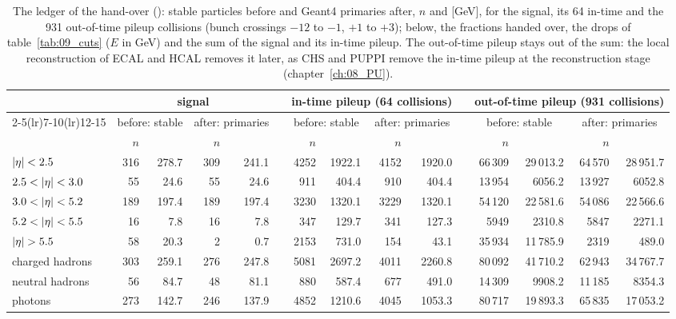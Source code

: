 \begin{table}[htbp]
\centering\scriptsize\setlength{\tabcolsep}{2.5pt}
\caption{The ledger of the hand-over (): stable particles before and Geant4 primaries
after, $n$ and \pt{} [GeV], for the signal, its 64 in-time and the 931 out-of-time pileup collisions (bunch crossings
$-12$ to $-1$, $+1$ to $+3$); below, the fractions handed over, the drops of table~\ref{tab:09_cuts} ($E$ in GeV) and
the sum of the signal and its in-time pileup. The out-of-time pileup stays out of the sum: the local reconstruction of
ECAL and HCAL removes it later, as CHS and PUPPI remove the in-time pileup at the reconstruction stage
(chapter~\ref{ch:08_PU}).}
\label{tab:09_ledger}
\begin{tabular}{lrrrrcrrrrcrrrr}
\toprule
 & \multicolumn{4}{c}{signal} & & \multicolumn{4}{c}{in-time pileup (64 collisions)} & & \multicolumn{4}{c}{out-of-time pileup (931 collisions)} \\
\cmidrule(lr){2-5}\cmidrule(lr){7-10}\cmidrule(lr){12-15}
 & \multicolumn{2}{c}{before: stable} & \multicolumn{2}{c}{after: primaries} & & \multicolumn{2}{c}{before: stable} & \multicolumn{2}{c}{after: primaries} & & \multicolumn{2}{c}{before: stable} & \multicolumn{2}{c}{after: primaries} \\
 & $n$ & \pt{} & $n$ & \pt{} & & $n$ & \pt{} & $n$ & \pt{} & & $n$ & \pt{} & $n$ & \pt{} \\
\midrule
$|\eta|<2.5$     & 316 & 278.7 & 309 & 241.1 & & 4252 & 1922.1 & 4152 & 1920.0 & & 66\,309 & 29\,013.2 & 64\,570 & 28\,951.7 \\
$2.5<\abseta<3.0$ & 55 & 24.6 & 55 & 24.6 & & 911 & 404.4 & 910 & 404.4 & & 13\,954 & 6056.2 & 13\,927 & 6052.8 \\
$3.0<\abseta<5.2$ & 189 & 197.4 & 189 & 197.4 & & 3230 & 1320.1 & 3229 & 1320.1 & & 54\,120 & 22\,581.6 & 54\,086 & 22\,566.6 \\
$5.2<\abseta<5.5$ & 16 & 7.8 & 16 & 7.8 & & 347 & 129.7 & 341 & 127.3 & & 5949 & 2310.8 & 5847 & 2271.1 \\
$\abseta>5.5$     & 58 & 20.3 & 2 & 0.7 & & 2153 & 731.0 & 154 & 43.1 & & 35\,934 & 11\,785.9 & 2319 & 489.0 \\
\midrule
charged hadrons & 303 & 259.1 & 276 & 247.8 & & 5081 & 2697.2 & 4011 & 2260.8 & & 80\,092 & 41\,710.2 & 62\,943 & 34\,767.7 \\
neutral hadrons & 56 & 84.7 & 48 & 81.1 & & 880 & 587.4 & 677 & 491.0 & & 14\,309 & 9908.2 & 11\,185 & 8354.3 \\
photons         & 273 & 142.7 & 246 & 137.9 & & 4852 & 1210.6 & 4045 & 1053.3 & & 80\,717 & 19\,893.3 & 65\,835 & 17\,053.2 \\

\end{tabular}
\end{table}
